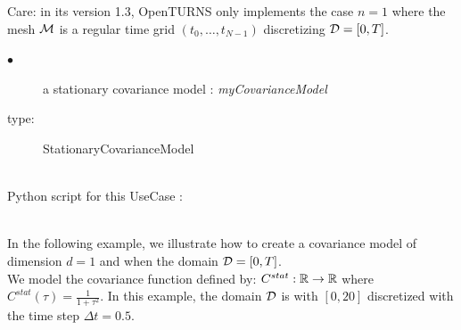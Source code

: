 Care: in its version 1.3, OpenTURNS only implements the case $n=1$ where the mesh
${\mathcal M}$ is a regular time grid $(t_0, \dots, t_{N-1})$ discretizing ${\mathcal D}=[0,T]$.\\




{
  \begin{description}
  \item[$\bullet$] a stationary covariance model : {\itshape myCovarianceModel}
  \item[type:] StationaryCovarianceModel
  \end{description}

}

\textspace\\
Python script for this UseCase :


\textspace\\




In the following example, we illustrate how to create a covariance model of dimension $d=1$ and when the domain ${\mathcal D}=[0,T]$.\\
We model the covariance function defined by: $C^{stat}:{\mathbb R} \rightarrow  {\mathbb R}$ where $C^{stat}(\tau) = \frac{1}{1 + \tau^2} $. In this example, the domain ${\mathcal D}$ is with $[0,20]$ discretized with the time step $\Delta t = 0.5$.\\


